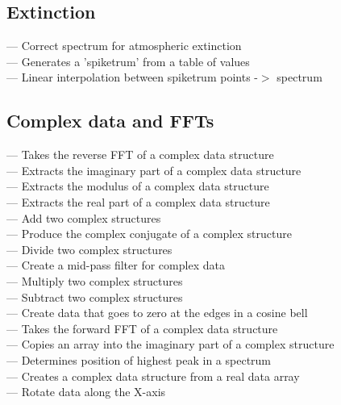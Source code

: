 
\subsection{\label{classifextinc}Extinction}

 --- Correct spectrum for atmospheric extinction\\
 --- Generates a 'spiketrum' from a table of values\\
 --- Linear interpolation between spiketrum points -$>$ spectrum


\subsection{\label{classifcomplex}Complex data and FFTs}

 --- Takes the reverse FFT of a complex data structure\\
 --- Extracts the imaginary part of a complex data structure\\
 --- Extracts the modulus of a complex data structure\\
 --- Extracts the real part of a complex data structure\\
 --- Add two complex structures\\
 --- Produce the complex conjugate of a complex structure\\
 --- Divide two complex structures\\
 --- Create a mid-pass filter for complex data\\
 --- Multiply two complex structures\\
 --- Subtract two complex structures\\
 --- Create data that goes to zero at the edges in a cosine bell\\
 --- Takes the forward FFT of a complex data structure\\
 --- Copies an array into the imaginary part of a complex structure\\
 --- Determines position of highest peak in a spectrum\\
 --- Creates a complex data structure from a real data array\\
 --- Rotate data along the X-axis

